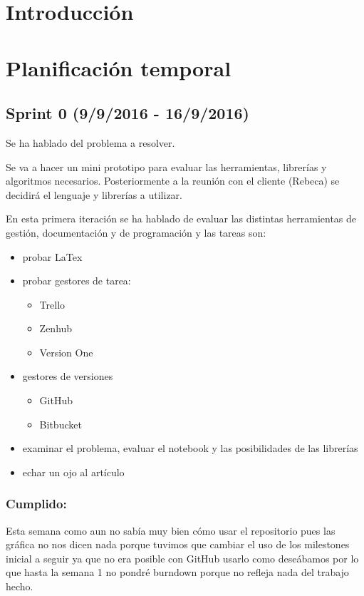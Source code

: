 
\section{Introducción}

\section{Planificación temporal}

\subsection{Sprint 0 (9/9/2016 - 16/9/2016)}
Se ha hablado del problema a resolver.

Se va a hacer un mini prototipo para evaluar las herramientas, librerías y algoritmos necesarios. Posteriormente a la reunión con el cliente (Rebeca) se decidirá el lenguaje y librerías a utilizar.

En esta primera iteración se ha hablado de evaluar las distintas herramientas de gestión, documentación y de programación y las tareas son:


\begin{itemize}
	\item probar LaTex 
	\item probar gestores de tarea: 
	\begin{itemize}
	\item Trello 
	\item Zenhub 
	\item Version One
	\end{itemize}
	\item gestores de versiones 
	\begin{itemize}
	\item GitHub 
	\item Bitbucket 
	\end{itemize}
	\item examinar el problema, evaluar el notebook y las posibilidades de las librerías \\
	\item echar un ojo al artículo 
\end{itemize}

\subsubsection{Cumplido:}
Esta semana como aun no sabía muy bien cómo usar el repositorio pues las gráfica no nos dicen nada porque tuvimos que cambiar el uso de los milestones inicial a seguir ya que no era posible con GitHub usarlo como deseábamos por lo que hasta la semana 1 no pondré burndown porque no refleja nada del trabajo hecho.

